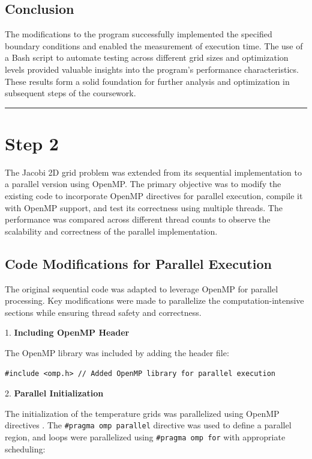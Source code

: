 \documentclass{article}
\begin{document}
\subsection{Conclusion}

The modifications to the program successfully implemented the specified boundary conditions and enabled the measurement of execution time. The use of a Bash script to automate testing across different grid sizes and optimization levels provided valuable insights into the program's performance characteristics. These results form a solid foundation for further analysis and optimization in subsequent steps of the coursework.

\rule{\linewidth}{0.5pt}

\section{Step 2}

The Jacobi 2D grid problem was extended from its sequential implementation to a parallel version using OpenMP. The primary objective was to modify the existing code to incorporate OpenMP directives for parallel execution, compile it with OpenMP support, and test its correctness using multiple threads. The performance was compared across different thread counts to observe the scalability and correctness of the parallel implementation.

\subsection{Code Modifications for Parallel Execution}

The original sequential code was adapted to leverage OpenMP for parallel processing. Key modifications were made to parallelize the computation-intensive sections while ensuring thread safety and correctness.

1. \textbf{Including OpenMP Header}

   The OpenMP library was included by adding the header file:

\begin{lstlisting}[style=CStyle, caption={OpenMP Header Inclusion}]
#include <omp.h> // Added OpenMP library for parallel execution
\end{lstlisting}

2. \textbf{Parallel Initialization}

    The initialization of the temperature grids was parallelized using OpenMP directives \parencite{chapman2007openmp}. The \texttt{\#pragma omp parallel} directive was used to define a parallel region, and loops were parallelized using \texttt{\#pragma omp for} with appropriate scheduling:
\end{document}
